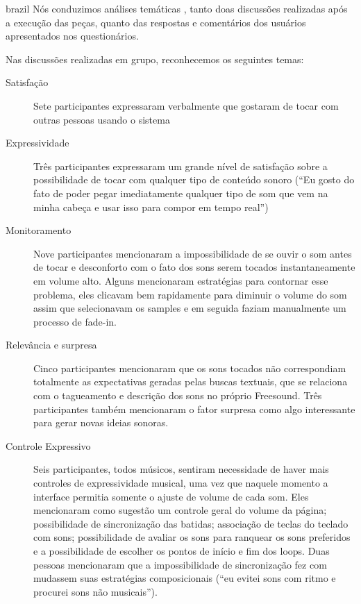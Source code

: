 \begin{otherlanguage*}{brazil}
Nós conduzimos análises temáticas \cite{Braun2006}, tanto doas discussões realizadas após a execução das peças, quanto das respostas e comentários dos usuários apresentados nos questionários. 

Nas discussões realizadas em grupo, reconhecemos os seguintes temas:

\begin{description}
 \item[Satisfação] Sete participantes expressaram verbalmente que gostaram de tocar com outras pessoas usando o sistema

  \item[Expressividade] Três participantes expressaram um grande nível de satisfação sobre a possibilidade de tocar com qualquer tipo de conteúdo sonoro (``Eu gosto do fato de poder pegar imediatamente qualquer tipo de som que vem na minha cabeça e usar isso para compor em tempo real'')

 \item[Monitoramento] Nove participantes mencionaram a impossibilidade de se ouvir o som antes de tocar e desconforto com o fato dos sons serem tocados instantaneamente em volume alto. Alguns mencionaram estratégias para contornar esse problema, eles clicavam bem rapidamente para diminuir o volume do som assim que selecionavam os samples e em seguida faziam manualmente um processo de fade-in.

 \item[Relevância e surpresa] Cinco participantes mencionaram que os sons tocados não correspondiam totalmente as expectativas geradas pelas buscas textuais, que se relaciona com o tagueamento e descrição dos sons no próprio Freesound. Três participantes também mencionaram o fator surpresa como algo interessante para gerar novas ideias sonoras.

 \item[Controle Expressivo] Seis participantes, todos músicos, sentiram necessidade de haver mais controles de expressividade musical, uma vez que naquele momento a interface permitia somente o ajuste de volume de cada som. Eles mencionaram como sugestão um controle geral do volume da página; possibilidade de sincronização das batidas; associação de teclas do teclado com sons; possibilidade de avaliar os sons para ranquear os sons preferidos e a possibilidade de escolher os pontos de início e fim dos loops. Duas pessoas mencionaram que a impossibilidade de sincronização fez com mudassem suas estratégias composicionais (``eu evitei sons com ritmo e procurei sons não musicais'').


\end{description}
\end{otherlanguage*}
